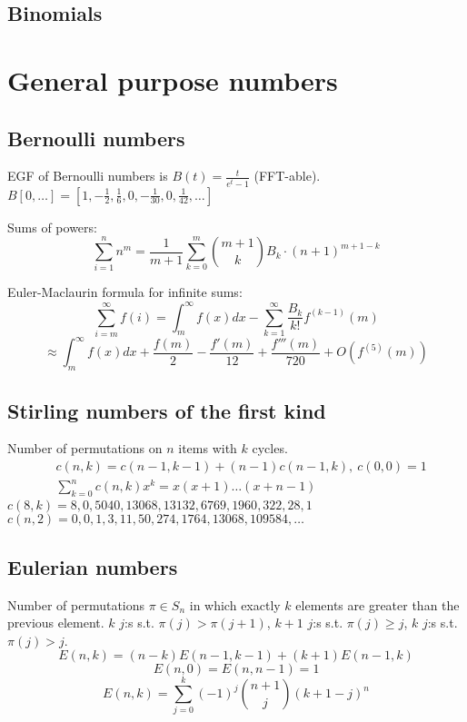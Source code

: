 	\subsection{Binomials}

\section{General purpose numbers}
	\subsection{Bernoulli numbers}
		EGF of Bernoulli numbers is $B(t)=\frac{t}{e^t-1}$ (FFT-able).
		$B[0,\ldots] = [1, -\frac{1}{2}, \frac{1}{6}, 0, -\frac{1}{30}, 0, \frac{1}{42}, \ldots]$

		Sums of powers:
		\small
		\[ \sum_{i=1}^n n^m = \frac{1}{m+1} \sum_{k=0}^m \binom{m+1}{k} B_k \cdot (n+1)^{m+1-k} \]
		\normalsize

		Euler-Maclaurin formula for infinite sums:
		\small
		\[ \sum_{i=m}^{\infty} f(i) = \int_m^\infty f(x) dx - \sum_{k=1}^\infty \frac{B_k}{k!}f^{(k-1)}(m) \]
		\[ \approx \int_{m}^\infty f(x)dx + \frac{f(m)}{2} - \frac{f'(m)}{12} + \frac{f'''(m)}{720} + O(f^{(5)}(m)) \]
		\normalsize

	\subsection{Stirling numbers of the first kind}
		Number of permutations on $n$ items with $k$ cycles.
		\begin{align*}
			&c(n,k) = c(n-1,k-1) + (n-1) c(n-1,k),\ c(0,0) = 1 \\
			&\textstyle \sum_{k=0}^n c(n,k)x^k = x(x+1) \dots (x+n-1)
		\end{align*}
		$c(8,k) = 8, 0, 5040, 13068, 13132, 6769, 1960, 322, 28, 1$ \\
		$c(n,2) = 0, 0, 1, 3, 11, 50, 274, 1764, 13068, 109584, \dots$

	\subsection{Eulerian numbers}
		Number of permutations $\pi \in S_n$ in which exactly $k$ elements are greater than the previous element. $k$ $j$:s s.t. $\pi(j)>\pi(j+1)$, $k+1$ $j$:s s.t. $\pi(j)\geq j$, $k$ $j$:s s.t. $\pi(j)>j$.
		$$E(n,k) = (n-k)E(n-1,k-1) + (k+1)E(n-1,k)$$
		$$E(n,0) = E(n,n-1) = 1$$
		$$E(n,k) = \sum_{j=0}^k(-1)^j\binom{n+1}{j}(k+1-j)^n$$

